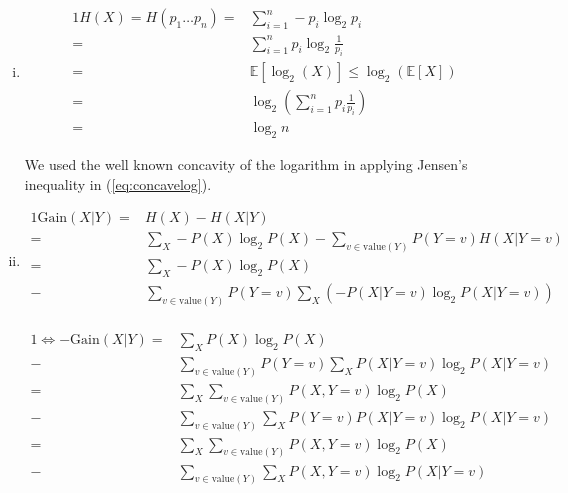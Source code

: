 \documentclass[10pt,a4paper,boxed]{hmcpset}
\begin{document}

\begin{problem}
\end{problem}
\begin{solution}
	\begin{enumerate}[(i)]	
		\item \label{task1}
		\begin{alignat}{1}
			H(X) = H\left(p_{1}\ldots p_{n}\right) = & \sum_{i=1}^{n}-p_{i}\log_{2}p_{i} \nonumber \\ 
				 = & \sum_{i=1}^{n}p_{i}\log_{2}\frac{1}{p_{i}} \nonumber \\
				 = & \mathbb{E}\left[\log_{2}\left(X\right)\right]\leq\log_{2}\left(\mathbb{E}\left[X\right]\right) \label{eq:concavelog} \\
				 = & \log_{2}\left(\sum_{i=1}^{n}p_{i}\frac{1}{p_{i}}\right) \nonumber \\
				 = & \log_{2}n \nonumber
		\end{alignat}
		
		We used the well known concavity of the logarithm in applying Jensen's inequality in (\ref{eq:concavelog}).
		
		\item
		\begin{alignat*}{1}
			\mathrm{Gain}\left(X\vert Y\right)     = & H\left(X\right)-H\left(X|Y\right)\\
												   = &\sum_{X}-P\left(X\right)\log_{2}P\left(X\right)-\sum_{v\in\mathrm{value}(Y)}P\left(Y=v\right)H\left(X\vert Y=v\right)\\
											       = & \sum_{X}-P\left(X\right)\log_{2}P\left(X\right)\\
											       - & \sum_{v\in\mathrm{value}(Y)}P\left(Y=v\right)\sum_{X}\left(-P\left(X\vert Y=v\right)\log_{2}P\left(X\vert Y=v\right)\right)\\
		\end{alignat*}
		
		\begin{alignat*}{1}
			\Leftrightarrow\mathrm{-Gain}\left(X\vert Y\right) = & \sum_{X}P\left(X\right)\log_{2}P\left(X\right)\\
															   - & \sum_{v\in\mathrm{value}(Y)}P\left(Y=v\right)\sum_{X}P\left(X\vert Y=v\right)\log_{2}P\left(X\vert Y=v\right)\\
 												   = & \sum_{X}\sum_{v\in\mathrm{value}(Y)}P\left(X,Y=v\right)\log_{2}P\left(X\right)\\
 												   - & \sum_{v\in\mathrm{value}(Y)}\sum_{X}P\left(Y=v\right)P\left(X\vert Y=v\right)\log_{2}P\left(X\vert Y=v\right)\\
												   = & \sum_{X}\sum_{v\in\mathrm{value}(Y)}P\left(X,Y=v\right)\log_{2}P\left(X\right)\\
												   - & \sum_{v\in\mathrm{value}(Y)}\sum_{X}P\left(X,Y=v\right)\log_{2}P\left(X\vert Y=v\right)\\
		\end{alignat*}
		

\end{enumerate}
\end{solution}
\end{document}

